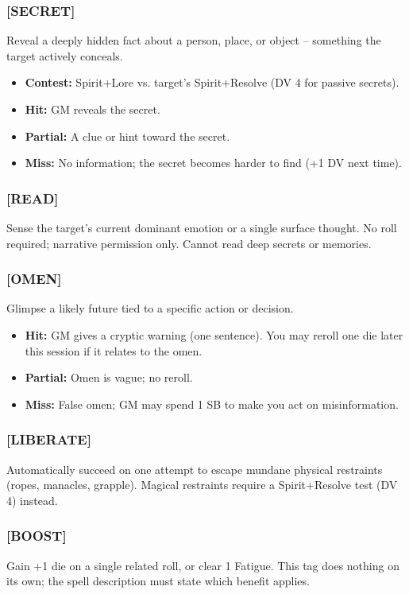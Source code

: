 \subsubsection{[SECRET]}
Reveal a deeply hidden fact about a person, place, or object -- something the target actively conceals.
\begin{itemize}
  \item \textbf{Contest:} Spirit+Lore vs. target's Spirit+Resolve (DV 4 for passive secrets).
  \item \textbf{Hit:} GM reveals the secret.
  \item \textbf{Partial:} A clue or hint toward the secret.
  \item \textbf{Miss:} No information; the secret becomes harder to find (+1 DV next time).
\end{itemize}

\subsubsection{[READ]}
Sense the target's current dominant emotion or a single surface thought. No roll required; narrative permission only. Cannot read deep secrets or memories.

\subsubsection{[OMEN]}
Glimpse a likely future tied to a specific action or decision.
\begin{itemize}
  \item \textbf{Hit:} GM gives a cryptic warning (one sentence). You may reroll one die later this session if it relates to the omen.
  \item \textbf{Partial:} Omen is vague; no reroll.
  \item \textbf{Miss:} False omen; GM may spend 1 SB to make you act on misinformation.
\end{itemize}

\subsubsection{[LIBERATE]}
Automatically succeed on one attempt to escape mundane physical restraints (ropes, manacles, grapple). Magical restraints require a Spirit+Resolve test (DV 4) instead.

\subsubsection{[BOOST]}
Gain +1 die on a single related roll, or clear 1 Fatigue. This tag does nothing on its own; the spell description must state which benefit applies.

